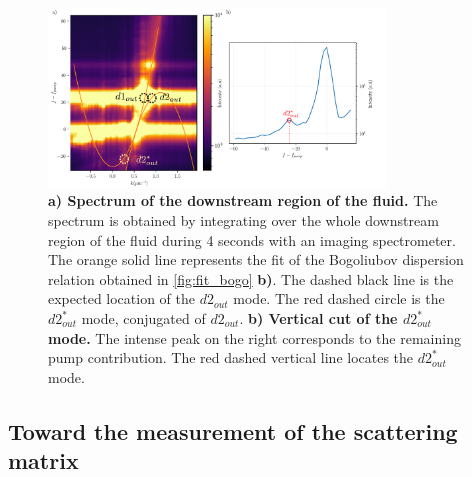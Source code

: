 \begin{figure}
    \centering
    \includegraphics[width=0.8\textwidth]{chap_stimulated_hawking/fig/disp_supersonic_spectro.pdf}
    \caption{\textbf{a) Spectrum of the downstream region of the fluid.} The spectrum is obtained by integrating over the whole downstream region of the fluid during 4 seconds
    with an imaging spectrometer. The orange solid line represents the fit of the Bogoliubov dispersion relation obtained in \autoref{fig:fit_bogo} \textbf{b)}. The dashed black line is the expected location of the $d2_{out}$ mode.
    The red dashed circle is the $d2_{out}^*$ mode, conjugated of $d2_{out}$. 
    \textbf{b) Vertical cut of the $d2_{out}^*$ mode.} The intense peak on the right corresponds to the remaining pump contribution. The red dashed vertical line locates the $d2_{out}^*$ mode.}
    \label{fig:spectrum_spectro}
\end{figure}
\bigskip

\subsection{Toward the measurement of the scattering matrix}
\label{sec:scattering_matrix_measurement}
